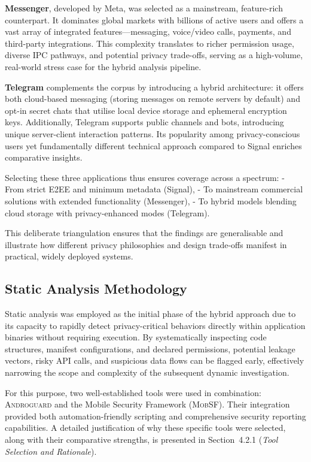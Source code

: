 \documentclass[a4paper,12pt]{report}
\begin{document}
\textbf{Messenger}, developed by Meta, was selected as a mainstream, feature-rich counterpart. It dominates global markets with billions of active users and offers a vast array of integrated features—messaging, voice/video calls, payments, and third-party integrations. This complexity translates to richer permission usage, diverse IPC pathways, and potential privacy trade-offs, serving as a high-volume, real-world stress case for the hybrid analysis pipeline.

\textbf{Telegram} complements the corpus by introducing a hybrid architecture: it offers both cloud-based messaging (storing messages on remote servers by default) and opt-in secret chats that utilise local device storage and ephemeral encryption keys. Additionally, Telegram supports public channels and bots, introducing unique server-client interaction patterns. Its popularity among privacy-conscious users yet fundamentally different technical approach compared to Signal enriches comparative insights.

Selecting these three applications thus ensures coverage across a spectrum:
- From strict E2EE and minimum metadata (Signal),
- To mainstream commercial solutions with extended functionality (Messenger),
- To hybrid models blending cloud storage with privacy-enhanced modes (Telegram).

This deliberate triangulation ensures that the findings are generalisable and illustrate how different privacy philosophies and design trade-offs manifest in practical, widely deployed systems.

\subsection{Static Analysis Methodology}

Static analysis was employed as the initial phase of the hybrid approach due to its capacity to rapidly detect privacy-critical behaviors directly within application binaries without requiring execution. By systematically inspecting code structures, manifest configurations, and declared permissions, potential leakage vectors, risky API calls, and suspicious data flows can be flagged early, effectively narrowing the scope and complexity of the subsequent dynamic investigation.

For this purpose, two well-established tools were used in combination: \textsc{Androguard} and the Mobile Security Framework (\textsc{MobSF}). Their integration provided both automation-friendly scripting and comprehensive security reporting capabilities. A detailed justification of why these specific tools were selected, along with their comparative strengths, is presented in Section~4.2.1 (\emph{Tool Selection and Rationale}).
\end{document}
